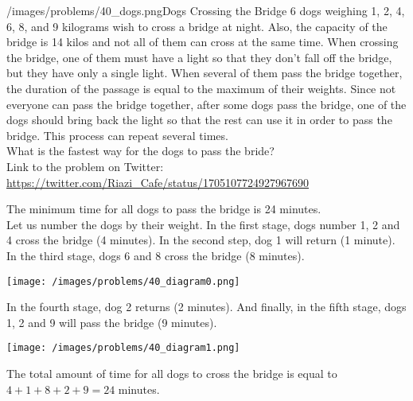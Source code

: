 \begin{problem}{/images/problems/40_dogs.png}{Dogs Crossing the Bridge}
	6 dogs weighing 1, 2, 4, 6, 8, and 9 kilograms wish to cross a bridge at night. Also, the capacity of the bridge is 14 kilos and not all of them can cross at the same time. When crossing the bridge, one of them must have a light so that they don't fall off the bridge, but they have only a single light. When several of them pass the bridge together, the duration of the passage is equal to the maximum of their weights. Since not everyone can pass the bridge together, after some  dogs pass the bridge, one of the dogs should bring back the light so that the rest can use it in order to pass the bridge. This process can repeat several times.\\[0.2cm]

What is the fastest way for the dogs to pass the bride?\\[0.2cm]

Link to the problem on Twitter:  \url{https://twitter.com/Riazi_Cafe/status/1705107724927967690}
\end{problem}
\begin{solution}
The minimum time  for all dogs to pass the bridge is 24 minutes.\\[0.2cm]

Let us number the dogs by their weight. In the first stage, dogs number 1, 2 and 4 cross the bridge (4 minutes). In the second step, dog 1 will return (1 minute). In the third stage, dogs 6 and 8 cross the bridge (8 minutes).
\begin{center}
	\texttt{[image: /images/problems/40\_diagram0.png]}
\end{center}

In the fourth stage, dog 2 returns (2 minutes). And finally, in the fifth stage, dogs 1, 2 and 9 will pass the bridge (9 minutes).

\begin{center}
	\texttt{[image: /images/problems/40\_diagram1.png]}
\end{center}

The total amount of time for all dogs to cross the bridge is equal to $4+1+8+2+9 = 24$ minutes.

\end{solution}
